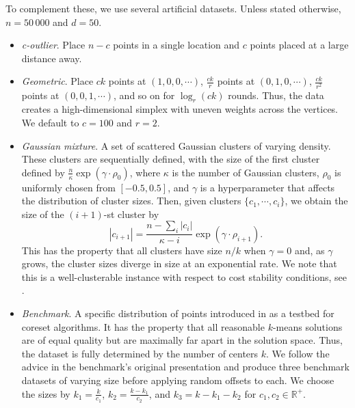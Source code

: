 To complement these, we use several artificial datasets. Unless stated otherwise, $n = 50\,000$ and $d=50$.
\begin{itemize}

    \item \emph{c-outlier}. Place $n-c$ points in a single location and $c$ points placed at a large distance away.

    \item \emph{Geometric}. Place $c k$ points at $(1, 0, 0, \cdots)$, $\frac{ck}{r}$ points at $(0, 1, 0, \cdots)$, $\frac{ck}{r^2}$ points
        at $(0, 0, 1, \cdots)$, and so on for $\log_r (ck)$ rounds. Thus, the data creates a high-dimensional simplex with uneven weights across the vertices. We
        default to $c = 100$ and $r=2$.

    \item \emph{Gaussian mixture}. A set of scattered Gaussian clusters of varying density. These clusters are sequentially defined, with the size of the first
        cluster defined by $\frac{n}{\kappa} \exp \left( \gamma \cdot \rho_0 \right)$, where $\kappa$ is the number of Gaussian clusters, $\rho_0$ is uniformly
        chosen from $[-0.5, 0.5]$, and $\gamma$ is a hyperparameter that affects the distribution of cluster sizes.  Then, given clusters $\{c_1, \cdots,
        c_i\}$, we obtain the size of the $(i+1)$-st cluster by \[|c_{i+1}| = \frac{n - \sum_i |c_i|}{\kappa - i}\exp \left( \gamma \cdot \rho_{i+1} \right).\]
        This has the property that all clusters have size $n / k$ when $\gamma = 0$ and, as $\gamma$ grows, the cluster sizes diverge in size at an exponential
        rate.  We note that this is a well-clusterable instance with respect to cost stability conditions, see \cite{AwS12,Cohen-AddadS17,KuK10,ORSS12}.

    \item \emph{Benchmark}. A specific distribution of points introduced in \cite{chrisESA} as a testbed for coreset algorithms.  It has the property that
        all reasonable $k$-means solutions are of equal quality but are maximally far apart in the solution space. Thus, the dataset is fully determined by the
        number of centers $k$. We follow the advice in the benchmark's original presentation and produce three benchmark datasets of varying size before
        applying random offsets to each. We choose the sizes by $k_1 = \frac{k}{c_1}$, $k_2 = \frac{k - k_1}{c_2}$, and $k_3 = k - k_1 - k_2$ for $c_1, c_2 \in
        \mathbb{R}^+$.

\end{itemize}

